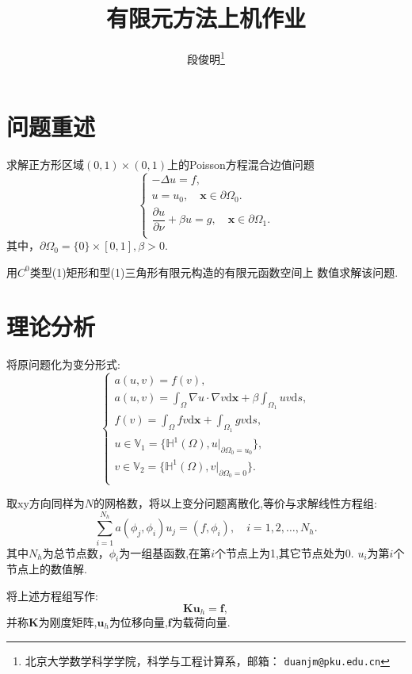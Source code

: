 \documentclass[a4paper, 11pt]{ctexart}
\title{有限元方法上机作业}
\author{段俊明\thanks{北京大学数学科学学院，科学与工程计算系，邮箱： {\tt duanjm@pku.edu.cn}}
}
\newcommand\bbV{\mathbb{V}}
\newcommand\bbH{\mathbb{H}}
\newcommand\dd{\mathrm{d}}
\newcommand\bx{\boldsymbol{x}}
\newcommand\bu{\boldsymbol{u}}
\newcommand\pd[2]{\dfrac{\partial {#1}}{\partial {#2}}}
\begin{document}
\maketitle

\section{问题重述}
求解正方形区域$(0,1)\times (0,1)$上的Poisson方程混合边值问题
\begin{equation}
	\begin{cases}
		-\Delta u = f, \\
		u = u_0, \quad \bx \in \partial\Omega_0. \\
		\pd{u}{\nu}+\beta u = g, \quad \bx \in \partial\Omega_1. \\
	\end{cases}
\end{equation}
其中，$\partial\Omega_0= \{0\}\times[0,1],\beta>0$.

用$C^0$类型(1)矩形和型(1)三角形有限元构造的有限元函数空间上
数值求解该问题.

\section{理论分析}
将原问题化为变分形式:
\begin{equation}
	\begin{cases}
		a(u,v) = f(v), \\
		a(u,v) = \int_\Omega \nabla u·\nabla v\dd \bx + \beta\int_{\Omega_1}uv\dd s, \\
		f(v) = \int_\Omega fv\dd \bx + \int_{\Omega_1}gv\dd s, \\
		u\in\bbV_1=\{\bbH^1(\Omega),u|_{\partial\Omega_0 = u_0} \}, \\
		v\in\bbV_2=\{\bbH^1(\Omega),v|_{\partial\Omega_0 = 0} \}. \\
	\end{cases}
\end{equation}

取xy方向同样为$N$的网格数，将以上变分问题离散化,等价与求解线性方程组:
\begin{equation}
	\sum_{i=1}^{N_h}a(\phi_j,\phi_i)u_j=(f,\phi_i),\quad i=1,2,\dots,N_h.
\end{equation}
其中$N_h$为总节点数，$\phi_i$为一组基函数,在第$i$个节点上为1,其它节点处为0.
$u_i$为第$i$个节点上的数值解.

将上述方程组写作:
$$\boldsymbol K\bu_h=\boldsymbol f,$$
并称$\boldsymbol K$为刚度矩阵,$\bu_h$为位移向量,$\boldsymbol f$为载荷向量.
\end{document}

